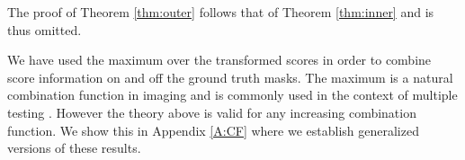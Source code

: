 \noindent The proof of Theorem \ref{thm:outer} follows that of Theorem \ref{thm:inner} and is thus omitted. 
\begin{remark}\label{rmk:max}
	We have used the maximum over the transformed scores in order to combine score information on and off the ground truth masks. The maximum is a natural combination function in imaging and is commonly used in the context of multiple testing \citep{Worsley1992}. However the theory above is valid for any increasing combination function. We show this in Appendix \ref{A:CF} where we establish generalized versions of these results.
\end{remark}




%
%


